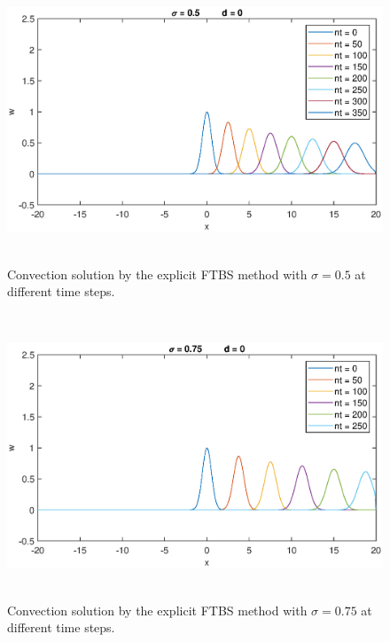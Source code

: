 \documentclass[letterpaper,12pt]{article}
\begin{document}
\begin{figure}[H] 
	\centering 
	\includegraphics[max height=8.5cm]{graphs/FTBS/Convection/sigma05d0.eps}
	\caption{Convection solution by the explicit FTBS method with $\sigma= 0.5$ at different time steps.}
	 \label{fig:FTBSsigma05d0}
\end{figure}
\vspace{1cm}
\begin{figure}[H] 
	\centering 
	\includegraphics[max height=8.5cm]{graphs/FTBS/Convection/sigma075d0.eps}
	\caption{Convection solution by the explicit FTBS method with $\sigma= 0.75$ at different time steps.}
	 \label{fig:FTBSsigma075d0}
\end{figure}

\newpage
\end{document}
